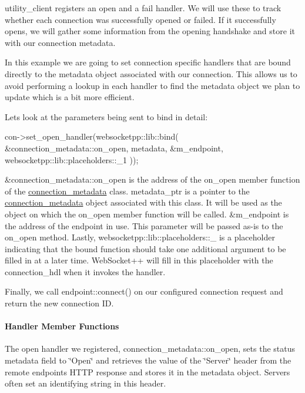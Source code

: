 {\ttfamily utility\+\_\+client} registers an open and a fail handler. We will use these to track whether each connection was successfully opened or failed. If it successfully opens, we will gather some information from the opening handshake and store it with our connection metadata.

In this example we are going to set connection specific handlers that are bound directly to the metadata object associated with our connection. This allows us to avoid performing a lookup in each handler to find the metadata object we plan to update which is a bit more efficient.

Lets look at the parameters being sent to bind in detail\+:


\begin{DoxyCode}
con->set\_open\_handler(websocketpp::lib::bind(
    &connection\_metadata::on\_open,
    metadata,
    &m\_endpoint,
    websocketpp::lib::placeholders::\_1
));
\end{DoxyCode}


{\ttfamily \&connection\+\_\+metadata\+::on\+\_\+open} is the address of the {\ttfamily on\+\_\+open} member function of the {\ttfamily \hyperlink{classconnection__metadata}{connection\+\_\+metadata}} class. {\ttfamily metadata\+\_\+ptr} is a pointer to the {\ttfamily \hyperlink{classconnection__metadata}{connection\+\_\+metadata}} object associated with this class. It will be used as the object on which the {\ttfamily on\+\_\+open} member function will be called. {\ttfamily \&m\+\_\+endpoint} is the address of the endpoint in use. This parameter will be passed as-\/is to the {\ttfamily on\+\_\+open} method. Lastly, {\ttfamily websocketpp\+::lib\+::placeholders\+::\+\_} is a placeholder indicating that the bound function should take one additional argument to be filled in at a later time. Web\+Socket++ will fill in this placeholder with the {\ttfamily connection\+\_\+hdl} when it invokes the handler.

Finally, we call {\ttfamily endpoint\+::connect()} on our configured connection request and return the new connection ID.

\paragraph*{Handler Member Functions}

The open handler we registered, {\ttfamily connection\+\_\+metadata\+::on\+\_\+open}, sets the status metadata field to \char`\"{}\+Open\char`\"{} and retrieves the value of the \char`\"{}\+Server\char`\"{} header from the remote endpoint\textquotesingle{}s H\+T\+TP response and stores it in the metadata object. Servers often set an identifying string in this header.

